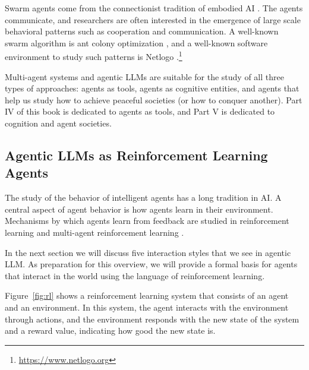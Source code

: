 Swarm agents come from the connectionist tradition of embodied AI  \citep{brooks1990elephants}. The agents communicate, and researchers are often interested in the emergence of large scale behavioral patterns such as cooperation and communication. A well-known swarm algorithm is ant colony optimization \citep{dorigo2007ant}, and a well-known software environment to study such patterns is Netlogo \citep{wilensky2015introduction}.\footnote{\url{https://www.netlogo.org}}

Multi-agent systems and agentic LLMs are suitable for the study of all three types of approaches:  agents as  tools, agents as cognitive entities, and  agents that help  us study how to achieve peaceful societies (or how to conquer another). Part IV of this book is dedicated to agents as tools, and Part V is dedicated to cognition and agent societies.

\subsection{Agentic LLMs as Reinforcement Learning Agents}
The study of the behavior of intelligent agents has a long
tradition in AI. A central aspect of agent behavior is how agents learn in their environment. Mechanisms by which agents learn from feedback are studied in reinforcement learning \citep{sutton2018reinforcement} and multi-agent reinforcement learning \citep{wong2021multiagent}. 

In the next section we will discuss five  interaction styles that we see in agentic LLM. As preparation for this overview, we will provide a formal basis for agents that interact in the world using the language of reinforcement learning. 




Figure~\ref{fig:rl} shows a  reinforcement learning  system that consists of an agent and an environment. In this system, the agent interacts with the
environment through actions, and the environment responds with the new
state of the system and a reward value, indicating how good the new
state is. 


